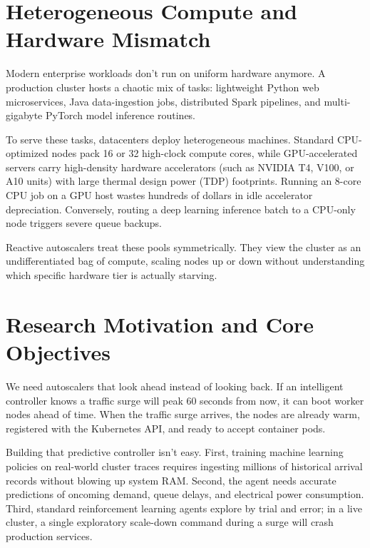 \documentclass[12pt]{report}
\begin{document}
\section{Heterogeneous Compute and Hardware Mismatch}

Modern enterprise workloads don't run on uniform hardware anymore. A production cluster hosts a chaotic mix of tasks: lightweight Python web microservices, Java data-ingestion jobs, distributed Spark pipelines, and multi-gigabyte PyTorch model inference routines. 

To serve these tasks, datacenters deploy heterogeneous machines. Standard CPU-optimized nodes pack 16 or 32 high-clock compute cores, while GPU-accelerated servers carry high-density hardware accelerators (such as NVIDIA T4, V100, or A10 units) with large thermal design power (TDP) footprints. Running an 8-core CPU job on a GPU host wastes hundreds of dollars in idle accelerator depreciation. Conversely, routing a deep learning inference batch to a CPU-only node triggers severe queue backups.

Reactive autoscalers treat these pools symmetrically. They view the cluster as an undifferentiated bag of compute, scaling nodes up or down without understanding which specific hardware tier is actually starving.

\section{Research Motivation and Core Objectives}

We need autoscalers that look ahead instead of looking back. If an intelligent controller knows a traffic surge will peak 60 seconds from now, it can boot worker nodes ahead of time. When the traffic surge arrives, the nodes are already warm, registered with the Kubernetes API, and ready to accept container pods.

Building that predictive controller isn't easy. First, training machine learning policies on real-world cluster traces requires ingesting millions of historical arrival records without blowing up system RAM. Second, the agent needs accurate predictions of oncoming demand, queue delays, and electrical power consumption. Third, standard reinforcement learning agents explore by trial and error; in a live cluster, a single exploratory scale-down command during a surge will crash production services.
\end{document}
